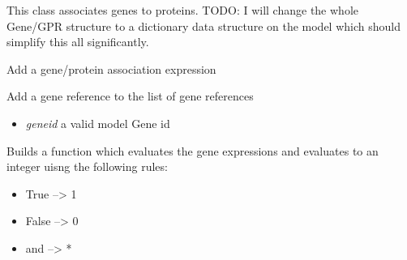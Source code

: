 \documentclass[a4paper,11pt,english]{sphinxmanual}
\begin{document}

\begin{fulllineitems}
\label{modules_doc:cbmpy.CBModel.GeneProteinAssociation}
This class associates genes to proteins.
TODO: I will change the whole Gene/GPR structure to a dictionary data structure on the model which should simplify this all significantly.

\begin{fulllineitems}
\label{modules_doc:cbmpy.CBModel.GeneProteinAssociation.addAssociation}
Add a gene/protein association expression

\end{fulllineitems}


\begin{fulllineitems}
\label{modules_doc:cbmpy.CBModel.GeneProteinAssociation.addGeneref}
Add a gene reference to the list of gene references
\begin{itemize}
\item {} 
\emph{geneid} a valid model Gene id

\end{itemize}

\end{fulllineitems}


\begin{fulllineitems}
\label{modules_doc:cbmpy.CBModel.GeneProteinAssociation.buildEvalFunc}
Builds a function which evaluates the gene expressions and evaluates to an integer uisng
the following rules:
\begin{itemize}
\item {} 
True --\textgreater{} 1

\item {} 
False --\textgreater{} 0

\item {} 
and --\textgreater{} *


\end{itemize}
\end{fulllineitems}
\end{fulllineitems}
\end{document}
